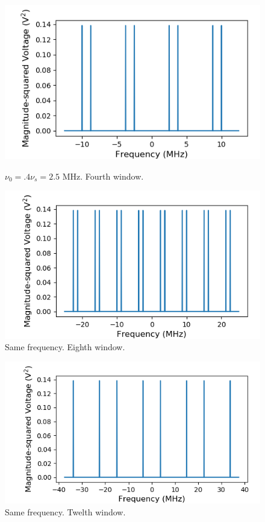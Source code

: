 \documentclass[a4paper]{article}
\begin{document}
\begin{figure}
\centering
\begin{minipage}{.5\textwidth}
	\centering
	\includegraphics[width=.9\linewidth]{5-6/4window}
	\caption{$\nu_0 = .4 \nu_s = 2.5$ MHz. Fourth window.}
	\label{fig:win4}
\end{minipage}%
\begin{minipage}{.5\textwidth}
	\centering
	\includegraphics[width=.9\linewidth]{5-6/8window}
	\caption{Same frequency. Eighth window.}
	\label{fig:win8}
\end{minipage}
\end{figure}

\begin{figure}
\centering
\includegraphics[width=.45\linewidth]{5-6/12window}
\caption{\label{fig:win12}Same frequency. Twelth window.}
\end{figure}
\end{document}
